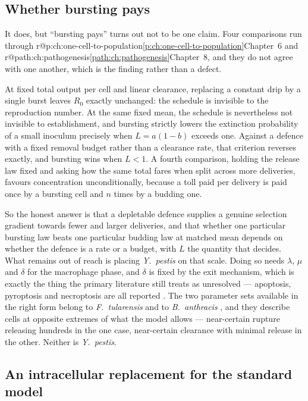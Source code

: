 \documentclass[11pt,a4paper]{report}
\makeatletter
\newcommand{\ft}{\textit{F.~tularensis}}
\newcommand{\yp}{\textit{Y.~pestis}}
\providecommand{\mextref}[2]{%
  \ifcsname r@#1\endcsname\cref{#1}\else#2\fi}
\theoremstyle{plain}
\theoremstyle{remark}
\makeatother
\begin{document}
\subsection{Whether bursting pays}
\label{con:sec:q2}

It does, but ``bursting pays'' turns out not to be one claim. Four
comparisons run through \mextref{p:ch:one-cell-to-population}{Chapter~6} and
\mextref{path:ch:pathogenesis}{Chapter~8}, and they do not agree with one
another, which is the finding rather than a defect.

At fixed total output per cell and linear clearance, replacing a constant
drip by a single burst leaves $R_0$ exactly unchanged: the schedule is
invisible to the reproduction number. At the same fixed mean, the schedule is
nevertheless not invisible to establishment, and bursting strictly lowers the
extinction probability of a small inoculum precisely when $L=a(1-b)$ exceeds
one. Against a defence with a fixed removal budget rather than a clearance
rate, that criterion reverses exactly, and bursting wins when $L<1$. A fourth
comparison, holding the release law fixed and asking how the same total fares
when split across more deliveries, favours concentration unconditionally,
because a toll paid per delivery is paid once by a bursting cell and $n$
times by a budding one.

So the honest answer is that a depletable defence supplies a genuine
selection gradient towards fewer and larger deliveries, and that whether one
particular bursting law beats one particular budding law at matched mean
depends on whether the defence is a rate or a budget, with $L$ the quantity
that decides. What remains out of reach is placing \yp{} on that scale. Doing
so needs $\lambda$, $\mu$ and $\delta$ for the macrophage phase, and $\delta$
is fixed
by the exit mechanism, which is exactly the thing the primary literature
still treats as unresolved --- apoptosis, pyroptosis and necroptosis are all
reported \cite{MonackEtAl1997,ZaubermanEtAl2006,PetersEtAl2013}. The two
parameter sets available in the right form belong to \ft{}
\cite{carruthers2020stochastic} and to \textit{B.~anthracis}
\cite{williams2021anthrax}, and they describe cells at opposite extremes of
what the model allows --- near-certain rupture releasing hundreds in the one
case, near-certain clearance with minimal release in the other. Neither is
\yp{}.

\subsection{An intracellular replacement for the standard model}
\label{con:sec:q3}
\end{document}
